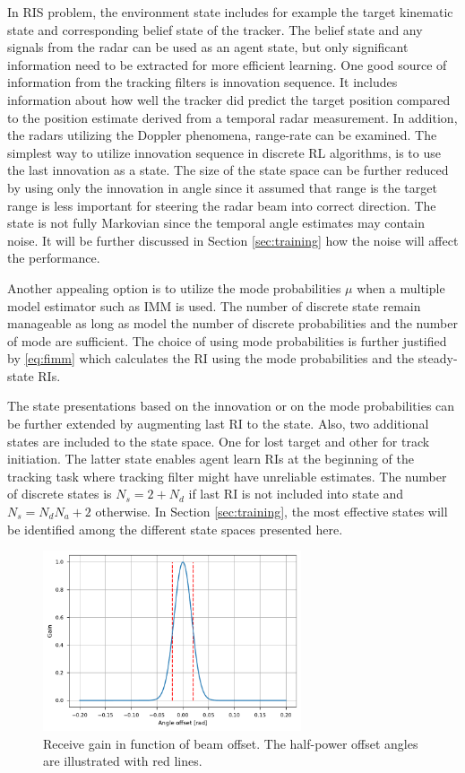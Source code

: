 \documentclass[english, 12pt, a4paper, elec, utf8, a-1b, online]{aaltothesis}
\begin{document}
In RIS problem, 
the environment state includes for example the target kinematic state and corresponding belief state of the tracker. 
The belief state and any signals from the radar can be used as an agent state, but only significant information need to be extracted for more efficient learning. 
One good source of information from the tracking filters is innovation sequence. 
It includes information about how well the tracker did predict the target position compared to the position estimate derived from a temporal radar measurement. 
In addition, 
the radars utilizing the Doppler phenomena, 
range-rate can be examined. 
The simplest way to utilize innovation sequence in discrete RL algorithms, is to use the last innovation as a state. 
The size of the state space can be further reduced by using only the innovation in angle since it assumed that range is the target range is less important for steering the radar beam into correct direction. 
The state is not fully Markovian since the temporal angle estimates may contain noise. 
It will be further discussed in Section \ref{sec:training} how the noise will affect the performance.

Another appealing option is to utilize the mode probabilities $\mu$ when a multiple model estimator such as IMM is used. 
The number of discrete state remain manageable as long as model the number of discrete probabilities and the number of mode are sufficient. 
The choice of using mode probabilities is further justified by \eqref{eq:fimm} which calculates the RI using the mode probabilities and the steady-state RIs. 

The state presentations based on the innovation or on the mode probabilities can be further extended by augmenting last RI to the state.
Also, two additional states are included to the state space. 
One for lost target and other for track initiation.
The latter state enables agent learn RIs at the beginning of the tracking task where tracking filter might have unreliable estimates.
The number of discrete states is $N_s = 2+N_d$ if last RI is not included into state and $N_s = N_d N_a + 2$ otherwise.
In Section \ref{sec:training}, the most effective states will be identified among the different state spaces presented here.


\begin{figure}[t]
    \centering
    \includegraphics[width=0.68\textwidth]{figures/benchmark/beamwidth.pdf}
    \caption{Receive gain in function of beam offset. 
    The half-power offset angles are illustrated with red lines.}
    \label{fig:beamwidth}
\end{figure}
\end{document}

